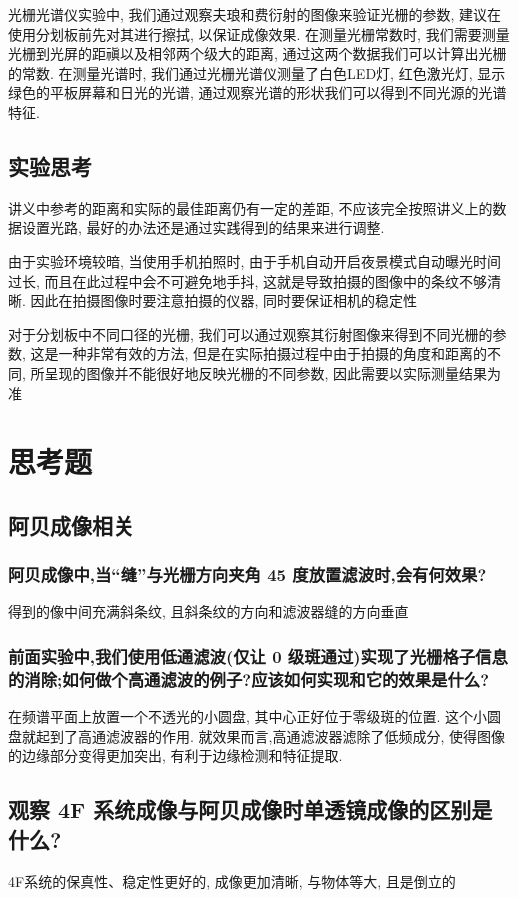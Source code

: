 \documentclass[zihao=5, UTF8]{article}
\theoremstyle{MyLineTheoremStyle} %
\theoremstyle{MyBlockTheoremStyle} %
\theoremstyle{MySubsubsectionStyle} %
\begin{document}
光栅光谱仪实验中, 我们通过观察夫琅和费衍射的图像来验证光栅的参数, 建议在使用分划板前先对其进行擦拭, 以保证成像效果. 在测量光栅常数时, 我们需要测量光栅到光屏的距禛以及相邻两个级大的距离, 通过这两个数据我们可以计算出光栅的常数. 在测量光谱时, 我们通过光栅光谱仪测量了白色LED灯, 红色激光灯, 显示绿色的平板屏幕和日光的光谱, 通过观察光谱的形状我们可以得到不同光源的光谱特征. 

\subsection{实验思考}
讲义中参考的距离和实际的最佳距离仍有一定的差距, 不应该完全按照讲义上的数据设置光路, 最好的办法还是通过实践得到的结果来进行调整. 

由于实验环境较暗, 当使用手机拍照时, 由于手机自动开启夜景模式自动曝光时间过长, 而且在此过程中会不可避免地手抖, 这就是导致拍摄的图像中的条纹不够清晰. 因此在拍摄图像时要注意拍摄的仪器, 同时要保证相机的稳定性

对于分划板中不同口径的光栅, 我们可以通过观察其衍射图像来得到不同光栅的参数, 这是一种非常有效的方法, 但是在实际拍摄过程中由于拍摄的角度和距离的不同, 所呈现的图像并不能很好地反映光栅的不同参数, 因此需要以实际测量结果为准

\section{思考题}
\subsection{阿贝成像相关}
\subsubsection{ 阿贝成像中,当“缝”与光栅方向夹角 45 度放置滤波时,会有何效果?}
得到的像中间充满斜条纹, 且斜条纹的方向和滤波器缝的方向垂直
\subsubsection{前面实验中,我们使用低通滤波(仅让 0 级斑通过)实现了光栅格子信息的消除;如何做个高通滤波的例子?应该如何实现和它的效果是什么?}
在频谱平面上放置一个不透光的小圆盘, 其中心正好位于零级斑的位置. 这个小圆盘就起到了高通滤波器的作用. 就效果而言,高通滤波器滤除了低频成分, 使得图像的边缘部分变得更加突出, 有利于边缘检测和特征提取. 
\subsection{观察 4F 系统成像与阿贝成像时单透镜成像的区别是什么?}
4F系统的保真性、稳定性更好的, 成像更加清晰, 与物体等大, 且是倒立的
\end{document}
